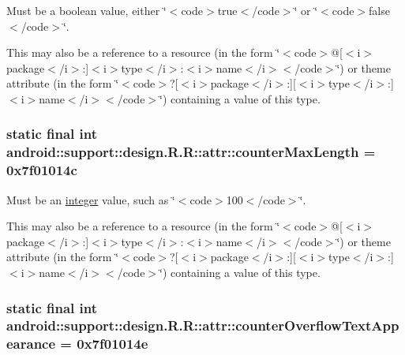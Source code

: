 Must be a boolean value, either \char`\"{}$<$code$>$true$<$/code$>$\char`\"{} or \char`\"{}$<$code$>$false$<$/code$>$\char`\"{}. 

This may also be a reference to a resource (in the form \char`\"{}$<$code$>$@\mbox{[}$<$i$>$package$<$/i$>$:\mbox{]}$<$i$>$type$<$/i$>$:$<$i$>$name$<$/i$>$$<$/code$>$\char`\"{}) or theme attribute (in the form \char`\"{}$<$code$>$?\mbox{[}$<$i$>$package$<$/i$>$:\mbox{]}\mbox{[}$<$i$>$type$<$/i$>$:\mbox{]}$<$i$>$name$<$/i$>$$<$/code$>$\char`\"{}) containing a value of this type. \hypertarget{classandroid_1_1support_1_1design_1_1_r_1_1attr_49fe58f44986a81da583a570df94812c}{
\subsubsection[{counterMaxLength}]{\setlength{\rightskip}{0pt plus 5cm}static final int android::support::design.R.R::attr::counterMaxLength = 0x7f01014c}}
\label{classandroid_1_1support_1_1design_1_1_r_1_1attr_49fe58f44986a81da583a570df94812c}


Must be an \hyperlink{classandroid_1_1support_1_1design_1_1_r_1_1integer}{integer} value, such as \char`\"{}$<$code$>$100$<$/code$>$\char`\"{}. 

This may also be a reference to a resource (in the form \char`\"{}$<$code$>$@\mbox{[}$<$i$>$package$<$/i$>$:\mbox{]}$<$i$>$type$<$/i$>$:$<$i$>$name$<$/i$>$$<$/code$>$\char`\"{}) or theme attribute (in the form \char`\"{}$<$code$>$?\mbox{[}$<$i$>$package$<$/i$>$:\mbox{]}\mbox{[}$<$i$>$type$<$/i$>$:\mbox{]}$<$i$>$name$<$/i$>$$<$/code$>$\char`\"{}) containing a value of this type. \hypertarget{classandroid_1_1support_1_1design_1_1_r_1_1attr_e37c904c6216a1aeb343ef3e28496d5c}{
\subsubsection[{counterOverflowTextAppearance}]{\setlength{\rightskip}{0pt plus 5cm}static final int android::support::design.R.R::attr::counterOverflowTextAppearance = 0x7f01014e}}
\label{classandroid_1_1support_1_1design_1_1_r_1_1attr_e37c904c6216a1aeb343ef3e28496d5c}


